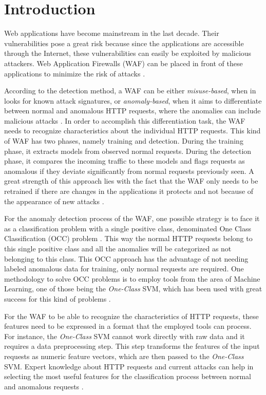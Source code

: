 \section{Introduction}

Web applications have become mainstream in the last decade.
Their vulnerabilities pose a great risk because since the applications
are accessible through the Internet, these vulnerabilities can easily be
exploited by malicious attackers.
Web Application Firewalls (WAF) can be placed in front of these
applications to minimize the risk of attacks \cite{torranoGimenez2015study}.

According to the detection method, a WAF can be either \textit{misuse-based},
when in looks for known attack signatures,
or \textit{anomaly-based}, when it aims to differentiate between normal and
anomalous HTTP requests, where the anomalies can include malicious attacks
\cite{torranoGimenez2015study}.
In order to accomplish this differentiation task, the WAF needs to recognize
characteristics about the individual HTTP requests.
This kind of WAF has two phases, namely training and detection.
During the training phase, it extracts models from observed normal requests.
During the detection phase, it compares the incoming traffic to these models
and flags requests as anomalous if they deviate significantly from normal
requests previously seen.
A great strength of this approach lies with the fact that the WAF only needs
to be retrained if there are changes in the applications it protects
and not because of the appearance of new attacks \cite{kruegel2003anomaly}.

For the anomaly detection process of the WAF, one possible strategy is to
face it as a classification problem with a single positive class,
denominated One Class Classification (OCC) problem \cite{khan2009survey}.
This way the normal HTTP requests belong to this single positive class and
all the anomalies will be categorized as not belonging to this class.
This OCC approach has the advantage of not needing labeled anomalous data
for training, only normal requests are required.
One methodology to solve OCC problems is to employ tools from the area of
Machine Learning, one of those being the \textit{One-Class} SVM, which has
been used with great success for this kind of problems \cite{khan2009survey}.

For the WAF to be able to recognize the characteristics of HTTP requests,
these features need to be expressed in a format that the employed tools
can process.
For instance, the \textit{One-Class} SVM cannot work directly with raw data
and it requires a data preprocessing step.
This step transforms the features of the input requests as numeric feature
vectors, which are then passed to the \textit{One-Class} SVM.
Expert knowledge about HTTP requests and current attacks can help in selecting
the most useful features for the classification process between normal and
anomalous requests \cite{kruegel2003anomaly}.


